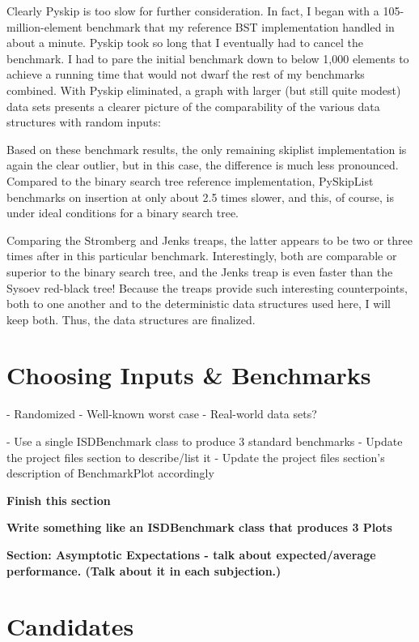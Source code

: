 \documentclass{article}
\newcommand {\todo}[1] {{\textbf{\color{red}#1}}}
\begin{document}


Clearly Pyskip is too slow for further consideration. In fact, I began with a 105-million-element benchmark that my reference BST implementation handled in about a minute. Pyskip took so long that I eventually had to cancel the benchmark. I had to pare the initial benchmark down to below 1,000 elements to achieve a running time that would not dwarf the rest of my benchmarks combined. With Pyskip eliminated, a graph with larger (but still quite modest) data sets presents a clearer picture of the comparability of the various data structures with random inputs:



Based on these benchmark results, the only remaining skiplist implementation is again the clear outlier, but in this case, the difference is much less pronounced. Compared to the binary search tree reference implementation, PySkipList benchmarks on insertion at only about 2.5 times slower, and this, of course, is under ideal conditions for a binary search tree.

Comparing the Stromberg and Jenks treaps, the latter appears to be two or three times after in this particular benchmark. Interestingly, both are comparable or superior to the binary search tree, and the Jenks treap is even faster than the Sysoev red-black tree! Because the treaps provide such interesting counterpoints, both to one another and to the deterministic data structures used here, I will keep both. Thus, the data structures are finalized.

\section{Choosing Inputs \& Benchmarks}
- Randomized
- Well-known worst case
- Real-world data sets?

- Use a single ISDBenchmark class to produce 3 standard benchmarks
- Update the project files section to describe/list it
- Update the project files section's description of BenchmarkPlot accordingly

\todo{Finish this section}

\todo{Write something like an ISDBenchmark class that produces 3 Plots}

\todo{Section: Asymptotic Expectations - talk about expected/average performance. (Talk about it in each subjection.)}
\newpage



\section{Candidates}










\end{document}
